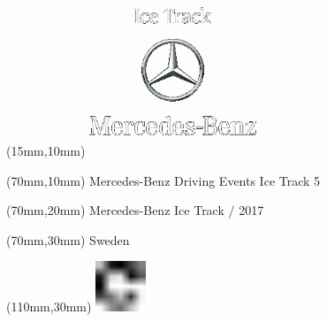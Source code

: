 \null\newpage
\begin{textblock*}{50mm}(15mm,10mm)%
\includegraphics[width=50mm]{LG/MER.png}
\end{textblock*}
\begin{textblock*}{130mm}(70mm,10mm)%
{\fontsize{20}{20}\selectfont Mercedes-Benz Driving Events Ice Track 5}\\
\end{textblock*}
\begin{textblock*}{120mm}(70mm,20mm)%
{\fontsize{16}{16}\selectfont Mercedes-Benz Ice Track / 2017}\\
\end{textblock*}
\begin{textblock*}{120mm}(70mm,30mm)%
{\fontsize{12}{12}\selectfont Sweden}
\end{textblock*}
\begin{textblock*}{30mm}(110mm,30mm)%
\centering
\includegraphics[height=15mm]{icons/fa-rotate-right.pdf}
\end{textblock*}
